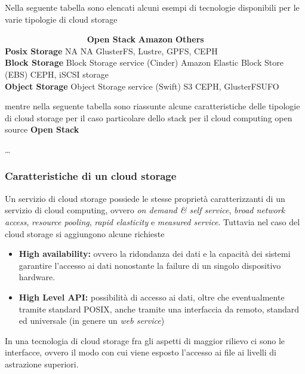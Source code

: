 Nella seguente tabella sono elencati alcuni esempi di tecnologie
disponibili per le varie tipologie di cloud storage

~~~~~~~~~~~~~~~~~~~\textbar{} \textbf{Open Stack} \textbar{}
\textbf{Amazon} \textbar{} \textbf{Others} \textbar{}\\
\textbf{Posix Storage} \textbar{} NA \textbar{} NA \textbar{} GlusterFS,
Lustre, GPFS, CEPH \textbar{}\\
\textbf{Block Storage} \textbar{} Block Storage service (Cinder)
\textbar{} Amazon Elastic Block Store (EBS) \textbar{} CEPH, iSCSI
storage \textbar{}\\
\textbf{Object Storage} \textbar{} Object Storage service (Swift)
\textbar{} S3 \textbar{} CEPH, GlusterFSUFO \textbar{}

mentre nella seguente tabella sono riassunte alcune caratteristiche
delle tipologie di cloud storage per il caso particolare dello stack per
il cloud computing open source \textbf{Open Stack}

\ldots{}

\subsubsection{Caratteristiche di un cloud
storage}\label{caratteristiche-di-un-cloud-storage}

Un servizio di cloud storage possiede le stesse proprietà
caratterizzanti di un servizio di cloud computing, ovvero \emph{on
demand \& self service}, \emph{broad network access}, \emph{resource
pooling}, \emph{rapid elasticity} e \emph{measured service}. Tuttavia
nel caso del cloud storage si aggiungono alcune richieste

\begin{itemize}
\tightlist
\item
  \textbf{High availability:} ovvero la ridondanza dei dati e la
  capacità dei sistemi garantire l'accesso ai dati nonostante la failure
  di un singolo dispositivo hardware.
\item
  \textbf{High Level API:} possibilità di accesso ai dati, oltre che
  eventualmente tramite standard POSIX, anche tramite una interfaccia da
  remoto, standard ed universale (in genere un \emph{web service})
\end{itemize}

In una tecnologia di cloud storage fra gli aspetti di maggior rilievo ci
sono le interfacce, ovvero il modo con cui viene esposto l'accesso ai
file ai livelli di astrazione superiori.

